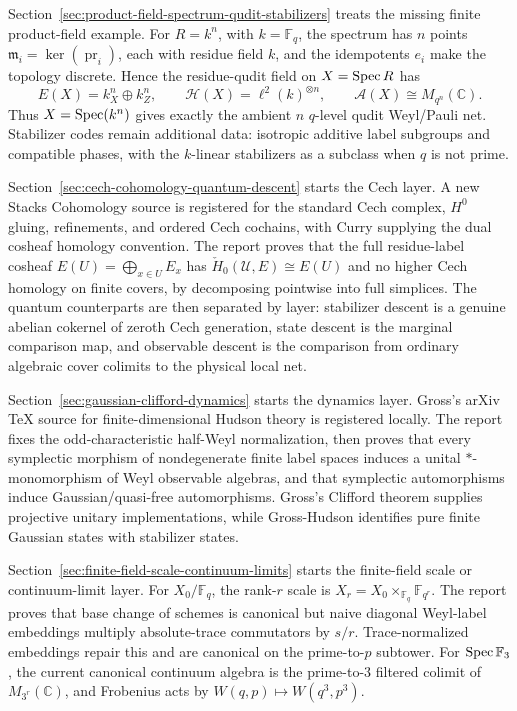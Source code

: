 Section~\ref{sec:product-field-spectrum-qudit-stabilizers} treats the missing
finite product-field example.  For \(R=k^n\), with \(k=\mathbb F_q\), the
spectrum has \(n\) points \(\mathfrak m_i=\ker(\operatorname{pr}_i)\), each
with residue field \(k\), and the idempotents \(e_i\) make the topology
discrete.  Hence the residue-qudit field on \(X=\operatorname{Spec} R\) has
\[
  E(X)=k_X^n\oplus k_Z^n,\qquad
  \mathcal H(X)=\ell^2(k)^{\otimes n},\qquad
  \mathcal A(X)\cong M_{q^n}(\mathbb C).
\]
Thus \(X=\operatorname{Spec}(k^n)\) gives exactly the ambient \(n\) \(q\)-level qudit
Weyl/Pauli net.  Stabilizer codes remain additional data: isotropic additive
label subgroups and compatible phases, with the \(k\)-linear stabilizers as a
subclass when \(q\) is not prime.

Section~\ref{sec:cech-cohomology-quantum-descent} starts the Cech layer.  A
new Stacks Cohomology source is registered for the standard Cech complex,
\(H^0\) gluing, refinements, and ordered Cech cochains, with Curry supplying
the dual cosheaf homology convention.  The report proves that the full
residue-label cosheaf \(E(U)=\bigoplus_{x\in U}E_x\) has
\(\check H_0(\mathcal U,E)\cong E(U)\) and no higher Cech homology on finite
covers, by decomposing pointwise into full simplices.  The quantum
counterparts are then separated by layer: stabilizer descent is a genuine
abelian cokernel of zeroth Cech generation, state descent is the marginal
comparison map, and observable descent is the comparison from ordinary
algebraic cover colimits to the physical local net.

Section~\ref{sec:gaussian-clifford-dynamics} starts the dynamics layer.
Gross's arXiv TeX source for finite-dimensional Hudson theory is registered
locally.  The report fixes the odd-characteristic half-Weyl normalization,
then proves that every symplectic morphism of nondegenerate finite label
spaces induces a unital \(*\)-monomorphism of Weyl observable algebras, and
that symplectic automorphisms induce Gaussian/quasi-free automorphisms.
Gross's Clifford theorem supplies projective unitary implementations, while
Gross-Hudson identifies pure finite Gaussian states with stabilizer states.

Section~\ref{sec:finite-field-scale-continuum-limits} starts the finite-field
scale or continuum-limit layer.  For \(X_0/\mathbb F_q\), the rank-\(r\)
scale is \(X_r=X_0\times_{\mathbb F_q}\mathbb F_{q^r}\).  The report proves
that base change of schemes is canonical but naive diagonal Weyl-label
embeddings multiply absolute-trace commutators by \(s/r\).  Trace-normalized
embeddings repair this and are canonical on the prime-to-\(p\) subtower.  For
\(\operatorname{Spec}\mathbb F_3\), the current canonical continuum algebra is the
prime-to-\(3\) filtered colimit of \(M_{3^r}(\mathbb C)\), and Frobenius acts
by \(W(q,p)\mapsto W(q^3,p^3)\).

